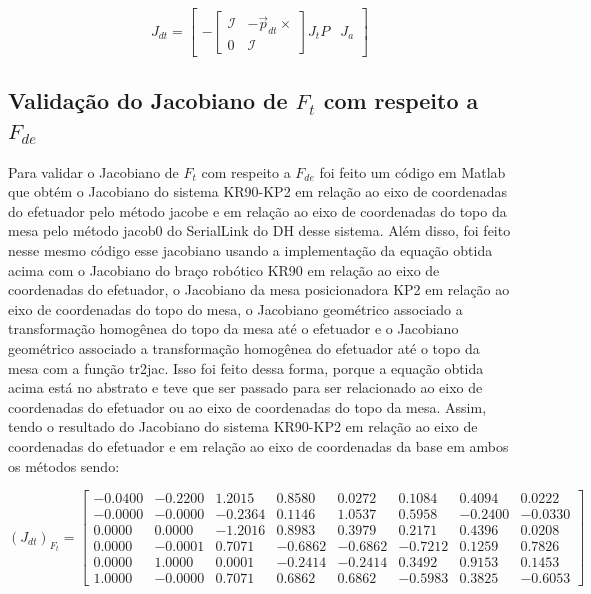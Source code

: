 \documentclass[10pt]{article}
\begin{document}
\begin{equation}
    J_{dt} =
    \begin{bmatrix}
        -
        \begin{bmatrix}
            \mathcal{I} & -\vec{p}_{dt} \times \\
            0 & \mathcal{I}
        \end{bmatrix}
        J_t P  & J_a
    \end{bmatrix}
\end{equation}

\subsection{Validação do Jacobiano de $F_t$ com respeito a $F_{de}$}

\quad Para validar o Jacobiano de $F_t$ com respeito a $F_{de}$ foi feito um código em Matlab que
obtém o Jacobiano do sistema KR90-KP2 em relação ao eixo de coordenadas do efetuador pelo método jacobe e
em relação ao eixo de coordenadas do topo da mesa pelo método jacob0 do SerialLink do DH desse sistema.
Além disso, foi feito nesse mesmo código esse jacobiano usando a implementação da equação obtida acima com
o Jacobiano do braço robótico KR90 em relação ao eixo de coordenadas do efetuador,
o Jacobiano da mesa posicionadora KP2 em relação ao eixo de coordenadas do topo do mesa,
o Jacobiano geométrico associado a transformação homogênea do topo da mesa até o efetuador e
o Jacobiano geométrico associado a transformação homogênea do efetuador até o topo da mesa com a função tr2jac.
Isso foi feito dessa forma, porque a equação obtida acima está no abstrato e teve que ser passado para ser relacionado ao eixo de coordenadas do efetuador ou ao eixo de coordenadas do topo da mesa.
Assim, tendo o resultado do Jacobiano do sistema KR90-KP2 em relação ao eixo de coordenadas do efetuador e em relação ao eixo de coordenadas da base
em ambos os métodos sendo:

\begin{equation}
    (J_{dt})_{F_t} =
    \begin{bmatrix}
    -0.0400 & -0.2200 &  1.2015 &  0.8580 &  0.0272 &  0.1084 &  0.4094 &  0.0222 \\
    -0.0000 & -0.0000 & -0.2364 &  0.1146 &  1.0537 &  0.5958 & -0.2400 & -0.0330 \\
    0.0000 &  0.0000 & -1.2016 &  0.8983 &  0.3979 &  0.2171 &  0.4396 &  0.0208 \\
    0.0000 & -0.0001 &  0.7071 & -0.6862 & -0.6862 & -0.7212 &  0.1259 &  0.7826 \\
    0.0000 &  1.0000 &  0.0001 & -0.2414 & -0.2414 &  0.3492 &  0.9153 &  0.1453 \\
    1.0000 & -0.0000 &  0.7071 &  0.6862 &  0.6862 & -0.5983 &  0.3825 & -0.6053
    \end{bmatrix}
\end{equation}
\end{document}

